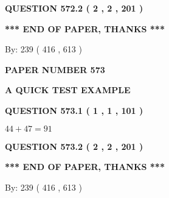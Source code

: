 \documentclass[12pt]{article}
\begin{document}
 
  
\vspace{0.2in}
  
{\textbf{\Large{QUESTION
572.2 
 ( 2 , 2 , 201 )
}}}
  
  
   
   
 \vspace{0.2in}
 
   
   
   
   
\vspace{1.0in} 
{\textbf{\large{ *** END OF PAPER, THANKS *** }}} 
   
   
\hspace{1.0in} By: 
 239 ( 416 ,  613 )
   
   
   
   
\newpage 
\setcounter{page}{ 
   573001 } 
   
   
   
   
 {\textbf{ \Large{ PAPER NUMBER  573  }}}
   
   
\vspace{0.2in}
   
   
   
   
   
   
 \vspace{0.2in}
{\LARGE {\textbf{ A QUICK TEST EXAMPLE}}}
   
   
  
\vspace{0.2in}
  
{\textbf{\Large{QUESTION
573.1 
 ( 1 , 1 , 101 )
}}}
  
  
 
 

$ %
44 +  %
47=   %
91$
 
 
  
\vspace{0.2in}
  
{\textbf{\Large{QUESTION
573.2 
 ( 2 , 2 , 201 )
}}}
  
  
   
   
 \vspace{0.2in}
 
   
   
   
   
\vspace{1.0in} 
{\textbf{\large{ *** END OF PAPER, THANKS *** }}} 
   
   
\hspace{1.0in} By: 
 239 ( 416 ,  613 )
   
\end{document}
